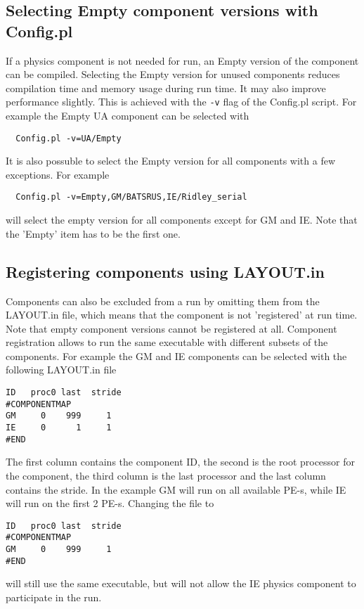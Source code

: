 \subsection{Selecting Empty component versions with Config.pl}

If a physics component is not needed for run, an Empty version of the
component can be compiled.
Selecting the Empty version for unused components reduces
compilation time and memory usage during run time.
It may also improve performance slightly.
This is achieved with the {\tt -v} flag of the Config.pl script. 
For example the Empty UA component can be selected with
\begin{verbatim}
  Config.pl -v=UA/Empty
\end{verbatim}
It is also possuble to select the Empty version for all components
with a few exceptions. For example
\begin{verbatim}
  Config.pl -v=Empty,GM/BATSRUS,IE/Ridley_serial
\end{verbatim}
will select the empty version for all components except for GM and IE.
Note that the 'Empty' item has to be the first one.

\subsection{Registering components using LAYOUT.in}

Components can also be excluded from a run by omitting them from the LAYOUT.in 
file, which means that the component is not 'registered' at run time.
Note that empty component versions cannot be registered at all.
Component registration allows to run the same executable with different 
subsets of the components. For example the GM and IE components 
can be selected with the following LAYOUT.in file
\begin{verbatim}
ID   proc0 last  stride
#COMPONENTMAP
GM     0    999     1
IE     0      1     1
#END
\end{verbatim}
The first column contains the component ID, the second is the
root processor for the component, the third column is the
last processor and the last column contains the stride.
In the example GM will run on all available PE-s, while IE
will run on the first 2 PE-s.  Changing the file to
\begin{verbatim}
ID   proc0 last  stride
#COMPONENTMAP
GM     0    999     1
#END
\end{verbatim}
will still use the same executable, but will not allow the IE 
physics component to participate in the run.

